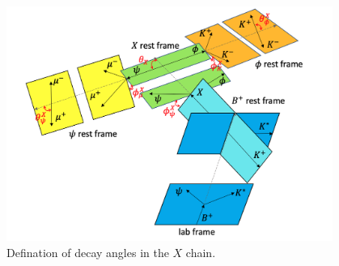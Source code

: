 \begin{figure}[!hbtp]
\centering
\includegraphics[width=0.95\textwidth]{Figures/03_Zcs/05_Likelihood/Cartoon/B2XK.png}%
   \caption{Defination of decay angles in the $X$ chain.}
\label{fig:cartoon_chain_XK}
\end{figure}

